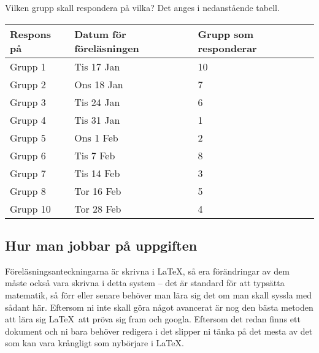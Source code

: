 \documentclass{tufte-handout}
\begin{document}
Vilken grupp skall respondera på vilka? Det anges i nedanstående tabell.

\begin{table}[h]
	\begin{tabularx}{\textwidth}{lll}
	Respons på & Datum för föreläsningen      & Grupp som responderar \\
	\midrule
	Grupp 1            & Tis 17 Jan & 10\\
	Grupp 2            & Ons 18 Jan & 7\\
	Grupp 3            & Tis 24 Jan & 6\\
	Grupp 4            & Tis 31 Jan & 1\\
	Grupp 5	      	   & Ons 1 Feb & 2\\
	Grupp 6            & Tis 7 Feb & 8\\
	Grupp 7            & Tis 14 Feb  & 3\\
	Grupp 8            & Tor 16 Feb  & 5\\
	Grupp 10            & Tor 28 Feb & 4%
	\end{tabularx}
\end{table}

\subsection{Hur man jobbar på uppgiften}

Föreläsningsanteckningarna är skrivna i \LaTeX, så era förändringar av dem måste också vara skrivna i detta system -- det är standard för att typsätta matematik, så förr eller senare behöver man lära sig det om man skall syssla med sådant här. Eftersom ni inte skall göra något avancerat är nog den bästa metoden att lära sig \LaTeX\ att pröva sig fram och googla. Eftersom det redan finns ett dokument och ni bara behöver redigera i det slipper ni tänka på det mesta av det som kan vara krångligt som nybörjare i \LaTeX.
\end{document}
